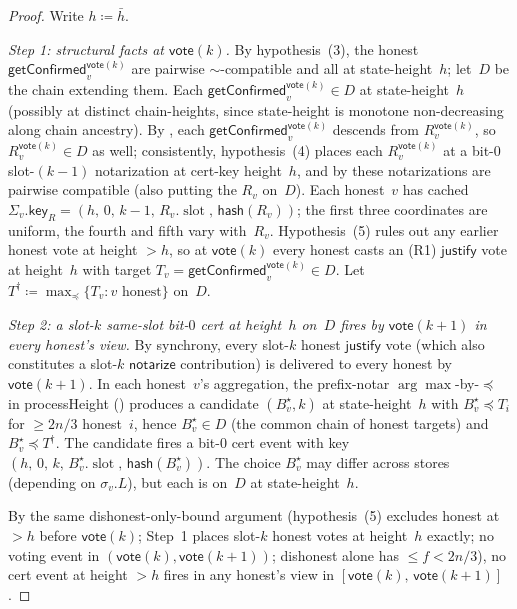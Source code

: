 \ifx\litemode\undefined\documentclass{article}\fi
\newcommand{\slot}[0]{\ensuremath{\operatorname{\mathrm{slot}}}}
\newcommand{\just}{\ensuremath{\mathsf{justify}}\xspace}
\newcommand{\notar}{\ensuremath{\mathsf{notarize}}\xspace}
\newcommand{\hash}{\mathsf{hash}}
\newcommand{\key}{\mathsf{key}}
\newcommand{\vote}{\mathsf{vote}}
\newcommand{\comm}[1]{\bar{#1}}
\newcommand{\processHeight}{\textsf{processHeight}\xspace}
\newcommand{\getConfirmed}{\textsf{getConfirmed}\xspace}
\theoremstyle{plain}
\theoremstyle{definition}
\theoremstyle{remark}
\begin{document}
\begin{proof}
Write $h \coloneqq \comm{h}$.

\emph{Step 1: structural facts at $\vote(k)$.}
By hypothesis~(3), the honest $\getConfirmed_v^{\vote(k)}$ are pairwise $\sim$-compatible and all at state-height~$h$; let~$D$ be the chain extending them. Each $\getConfirmed_v^{\vote(k)} \in D$ at state-height~$h$ (possibly at distinct chain-heights, since state-height is monotone non-decreasing along chain ancestry).
By , each $\getConfirmed_v^{\vote(k)}$ descends from $R_v^{\vote(k)}$, so $R_v^{\vote(k)} \in D$ as well; consistently, hypothesis~(4) places each $R_v^{\vote(k)}$ at a bit-$0$ slot-$(k-1)$ notarization at cert-key height~$h$, and by  these notarizations are pairwise compatible (also putting the $R_v$ on~$D$). Each honest~$v$ has cached $\Sigma_v.\key_R = (h,\, 0,\, k-1,\, R_v.\slot,\, \hash(R_v))$; the first three coordinates are uniform, the fourth and fifth vary with~$R_v$.
Hypothesis~(5) rules out any earlier honest vote at height $>h$, so at $\vote(k)$ every honest casts an (R1) \just vote at height~$h$ with target $T_v = \getConfirmed_v^{\vote(k)} \in D$. Let $T^\dagger \coloneqq \max_\preceq \{T_v : v \text{ honest}\}$ on~$D$.

\emph{Step 2: a slot-$k$ same-slot bit-$0$ cert at height~$h$ on~$D$ fires by $\vote(k+1)$ in every honest's view.}
By synchrony, every slot-$k$ honest \just vote (which also constitutes a slot-$k$ \notar contribution) is delivered to every honest by $\vote(k+1)$. In each honest~$v$'s aggregation, the prefix-notar $\arg\max$-by-$\preceq$ in \processHeight{} () produces a candidate $(B^\star_v, k)$ at state-height~$h$ with $B^\star_v \preceq T_i$ for $\geq 2n/3$ honest~$i$, hence $B^\star_v \in D$ (the common chain of honest targets) and $B^\star_v \preceq T^\dagger$. The candidate fires a bit-$0$ cert event with key $(h,\, 0,\, k,\, B^\star_v.\slot,\, \hash(B^\star_v))$. The choice $B^\star_v$ may differ across stores (depending on $\sigma_v.L$), but each is on~$D$ at state-height~$h$.

By the same dishonest-only-bound argument (hypothesis~(5) excludes honest at $>h$ before $\vote(k)$; Step~1 places slot-$k$ honest votes at height~$h$ exactly; no voting event in $(\vote(k), \vote(k+1))$; dishonest alone has $\leq f < 2n/3$), no cert event at height $>h$ fires in any honest's view in $[\vote(k),\, \vote(k+1)]$.


\end{proof}
\end{document}
